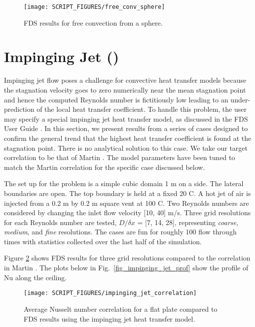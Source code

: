 \documentclass[11pt]{book}
\begin{document}
\begin{figure}[h]
   \centering
   \texttt{[image: SCRIPT\_FIGURES/free\_conv\_sphere]}
   \caption[Nusselt correlation free convection from a sphere]{\label{fig_free_conv_sphere} FDS results for free convection from a sphere.}
\end{figure}


\clearpage
\section{Impinging Jet (\texorpdfstring{}{impinging\_jet})}
\label{sec:impinging_jet}

Impinging jet flow poses a challenge for convective heat transfer models because the stagnation velocity goes to zero numerically near the mean stagnation point and hence the computed Reynolds number is fictitiously low leading to an under-prediction of the local heat transfer coefficient.  To handle this problem, the user may specify a special impinging jet heat transfer model, as discussed in the FDS User Guide \cite{FDS_Users_Guide}.  In this section, we present results from a series of cases designed to confirm the general trend that the highest heat transfer coefficient is found at the stagnation point.  There is no analytical solution to this case.  We take our target correlation to be that of Martin \cite{Martin:1977,Incropera:1}.  The model parameters have been tuned to match the Martin correlation for the specific case discussed below.

The set up for the problem is a simple cubic domain 1 m on a side.  The lateral boundaries are open.  The top boundary is held at a fixed 20 C.  A hot jet of air is injected from a 0.2 m by 0.2 m square vent at 100 C.  Two Reynolds numbers are considered by changing the inlet flow velocity [10, 40] m/s.  Three grid resolutions for each Reynolds number are tested, $D/\delta x$ = [7, 14, 28], representing \emph{coarse}, \emph{medium}, and \emph{fine} resolutions.  The cases are fun for roughly 100 flow through times with statistics collected over the last half of the simulation.

Figure \ref{fig_impinging_jet_corr} shows FDS results for three grid resolutions compared to the correlation in Martin \cite{Martin:1977,Incropera:1}.  The plots below in Fig.~\ref{fig_impinging_jet_prof} show the profile of Nu along the ceiling.

\begin{figure}[h]
   \centering
   \texttt{[image: SCRIPT\_FIGURES/impinging\_jet\_correlation]}
   \caption[Impinging jet Nusselt correlation]{\label{fig_impinging_jet_corr} Average Nusselt number correlation for a flat plate compared to FDS results using the impinging jet heat transfer model.}
\end{figure}
\end{document}
